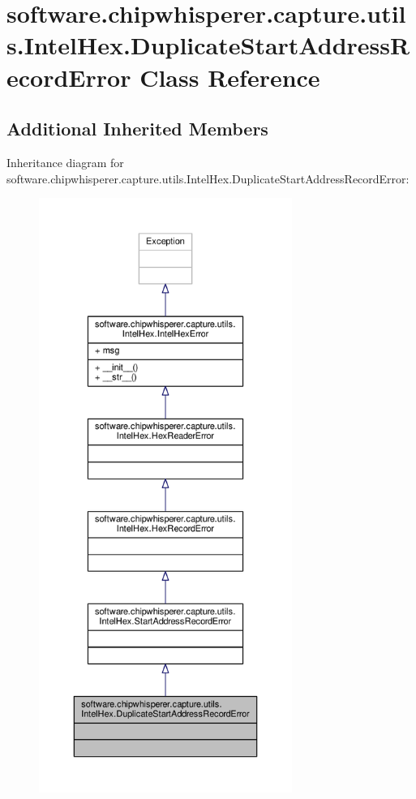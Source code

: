 \hypertarget{classsoftware_1_1chipwhisperer_1_1capture_1_1utils_1_1IntelHex_1_1DuplicateStartAddressRecordError}{}\section{software.\+chipwhisperer.\+capture.\+utils.\+Intel\+Hex.\+Duplicate\+Start\+Address\+Record\+Error Class Reference}
\label{classsoftware_1_1chipwhisperer_1_1capture_1_1utils_1_1IntelHex_1_1DuplicateStartAddressRecordError}
\subsection*{Additional Inherited Members}


Inheritance diagram for software.\+chipwhisperer.\+capture.\+utils.\+Intel\+Hex.\+Duplicate\+Start\+Address\+Record\+Error\+:\nopagebreak
\begin{figure}[H]
\begin{center}
\leavevmode
\includegraphics[height=550pt]{d3/d42/classsoftware_1_1chipwhisperer_1_1capture_1_1utils_1_1IntelHex_1_1DuplicateStartAddressRecordError__inherit__graph}
\end{center}
\end{figure}


